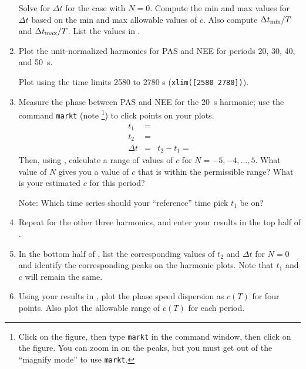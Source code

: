 \documentclass[11pt,titlepage,fleqn]{article}
\begin{document}
\begin{enumerate}
Solve for $\Delta t$ for the case with $N = 0$. Compute the min and max values for $\Delta t$ based on the min and max allowable values of $c$. Also compute $\Delta t_{\rm min}/T$ and $\Delta t_{\rm max}/T$. List the values in .


\item Plot the unit-normalized harmonics for PAS and NEE for periods 20, 30, 40, and 50~s.

Plot using the time limits 2580 to 2780 s (\verb+xlim([2580 2780])+).

\item Measure the phase between PAS and NEE for the 20~s harmonic; use the command \verb+markt+ (note \footnote{Click on the figure, then type {\tt markt} in the command window, then click on the figure. You can zoom in on the peaks, but you must get out of the ``magnify mode'' to use {\tt markt}.}) to click points on your plots. 
%
\begin{eqnarray*}
t_1 &=& 
\\
t_2 &=& 
\\
\Delta t &=& t_2 - t_1 =
\end{eqnarray*}
%
Then, using , calculate a range of values of $c$ for $N = -5, -4, \ldots, 5$. What value of $N$ gives you a value of $c$ that is within the permissible range? What is your estimated $c$ for this period?

Note: Which time series should your ``reference'' time pick $t_1$ be on?


\item Repeat for the other three harmonics, and enter your results in the top half of .


\item In the bottom half of , list the corresponding values of $t_2$ and $\Delta t$  for $N = 0$ and identify the corresponding peaks on the harmonic plots. Note that $t_1$ and $c$ will remain the same.

\item Using your results in , plot the phase speed dispersion as $c(T)$ for four points. Also plot the allowable range of $c(T)$ for each period.

\end{enumerate}

\end{document}
